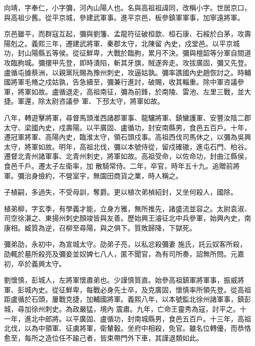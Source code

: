 \begin{pinyinscope}
 向靖，字奉仁，小字彌，河內山陽人也。名與高祖祖諱同，改稱小字。世居京口，與高祖少舊。從平京城，參建武軍事。進平京邑，板參鎮軍軍事，加寧遠將軍。



 京邑雖平，而群寇互起，彌與劉籓、孟龍符征破桓歆、桓石康、石綏於白茅，攻壽陽剋之。義熙三年，遷建武將軍、秦郡太守，北陳留
 內史，戍堂邑。以平京城功，封山陽縣五等侯。從征鮮卑，大戰於臨朐，累月不決。彌與檀韶等分軍自間道攻臨朐城。彌擐甲先登，即時潰陷，斬其牙旗，賊遂奔走。攻拔廣固，彌又先登。盧循屯據蔡洲，以親黨阮賜為豫州刺史，攻逼姑孰。彌率譙國內史趙恢討之。時輔國將軍毛脩之戍姑孰，告急續至，彌兼行進討，破賜，收其輜重。除中軍咨議參軍，將軍如故。盧循退走，高祖南征，彌為前鋒，於南陵、雷池、左里三戰，並大捷。軍還，除太尉咨議參
 軍、下邳太守，將軍如故。



 八年，轉遊擊將軍，尋督馬頭淮西諸郡軍事、龍驤將軍、鎮蠻護軍、安豐汝陰二郡太守、梁國內史，戍壽陽。以平廣固、盧循功，封安南縣男，食邑五百戶。十年，遷冠軍將軍、高陽內史，臨淮太守，領石頭戍事。高祖西伐司馬休之，以彌為吳興太守，將軍如故。明年，高祖北伐，彌以本號侍從，留戍確磝，進屯石門、柏谷。遷督北青州諸軍事、北青州刺史，將軍如故。高祖受命，以佐命功，封曲江縣侯，食邑千戶。遷太子左衛率，加
 散騎常侍。二年，卒官，時年五十九。追贈前將軍。彌治身儉約，不營室宇，無園田商貨之業，時人稱之。



 子植嗣，多過失，不受母訓，奪爵。更以植次弟楨紹封，又坐何殺人，國除。



 植弟柳，字玄季，有學義才能，立身方雅，無所推先，諸盛流並容之。太尉袁淑、司空徐湛之、東揚州刺史顏竣皆與友善。歷始興王濬征北中兵參軍，始興內史，南康相。臧質為逆，召柳至尋陽，與之俱下。質敗歸降，下獄死。



 彌弟劭，永初中，為宣城太守。劭弟子亮，以私忿殺彌妻
 施氏，託云奴客所殺，劭輒於墓所殺亮及彌妾並奴婢七八人，匿不聞官，為有司所奏，詔無所問。元嘉初，卒於義興太守。



 劉懷慎，彭城人，左將軍懷肅弟也。少謹慎質直。始參高祖鎮軍將軍事，振威將軍、彭城內史。從征鮮卑，每戰必身先士卒，及克廣固，懷慎率所領先登。從高祖距盧循於石頭，屢戰克捷，加輔國將軍。義熙八年，以本號監北徐州諸軍事，鎮彭城，尋加徐州刺史。為政嚴猛，境內
 震肅。九年，亡命王靈秀為寇，討平之。十一年，進北中郎將。以平廣固、盧循功，封南城縣男，食邑五百戶。十三年，高祖北伐，以為中領軍、征虜將軍，衛輦轂。坐府中相殺，免官。雖名位轉優，而恭恪愈至，每所之造位任不踰己者，皆束帶門外下車，其謹退類如此。




\end{pinyinscope}
